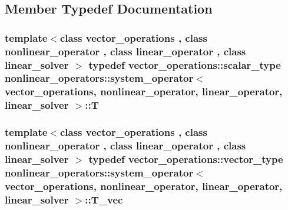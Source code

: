 \subsection{Member Typedef Documentation}
\hypertarget{classnonlinear__operators_1_1system__operator_ace913d6e3749a1c318f2e3654e9f570e}{
\subsubsection[{T}]{\setlength{\rightskip}{0pt plus 5cm}template$<$class vector\-\_\-operations , class nonlinear\-\_\-operator , class linear\-\_\-operator , class linear\-\_\-solver $>$ typedef {\bf vector\-\_\-operations\-::scalar\-\_\-type} {\bf nonlinear\-\_\-operators\-::system\-\_\-operator}$<$ {\bf vector\-\_\-operations}, nonlinear\-\_\-operator, linear\-\_\-operator, linear\-\_\-solver $>$\-::{\bf T}}}\label{classnonlinear__operators_1_1system__operator_ace913d6e3749a1c318f2e3654e9f570e}
\hypertarget{classnonlinear__operators_1_1system__operator_a87719a3fbcb842cc1f8305c59e17cbae}{
\subsubsection[{T\-\_\-vec}]{\setlength{\rightskip}{0pt plus 5cm}template$<$class vector\-\_\-operations , class nonlinear\-\_\-operator , class linear\-\_\-operator , class linear\-\_\-solver $>$ typedef {\bf vector\-\_\-operations\-::vector\-\_\-type} {\bf nonlinear\-\_\-operators\-::system\-\_\-operator}$<$ {\bf vector\-\_\-operations}, nonlinear\-\_\-operator, linear\-\_\-operator, linear\-\_\-solver $>$\-::{\bf T\-\_\-vec}}}\label{classnonlinear__operators_1_1system__operator_a87719a3fbcb842cc1f8305c59e17cbae}


